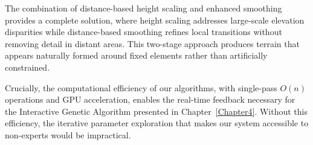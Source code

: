 The combination of distance-based height scaling and enhanced smoothing provides a complete solution, where height scaling addresses large-scale elevation disparities while distance-based smoothing refines local transitions without removing detail in distant areas. This two-stage approach produces terrain that appears naturally formed around fixed elements rather than artificially constrained.

Crucially, the computational efficiency of our algorithms, with single-pass $O(n)$ operations and GPU acceleration, enables the real-time feedback necessary for the Interactive Genetic Algorithm presented in Chapter~\ref{Chapter4}. Without this efficiency, the iterative parameter exploration that makes our system accessible to non-experts would be impractical. 